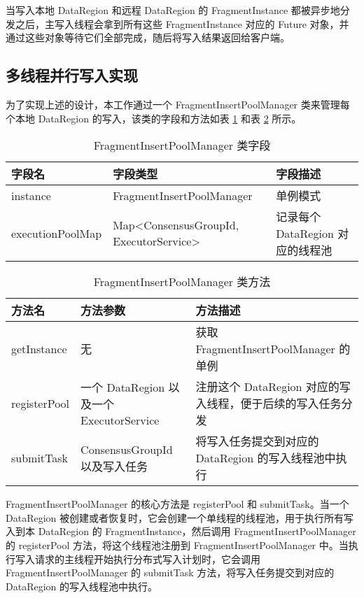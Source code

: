 当写入本地 DataRegion 和远程 DataRegion 的 FragmentInstance 都被异步地分发之后，主写入线程会拿到所有这些 FragmentInstance 对应的 Future 对象，并通过这些对象等待它们全部完成，随后将写入结果返回给客户端。

\subsection{多线程并行写入实现}
为了实现上述的设计，本工作通过一个 FragmentInsertPoolManager 类来管理每个本地 DataRegion 的写入，该类的字段和方法如表 \ref{tabular:fragment-insertion-pool-manager-fields} 和表 \ref{tabular:fragment-insertion-pool-manager-methods} 所示。

\begin{table}
  \centering
  \caption{FragmentInsertPoolManager 类字段}
  \label{tabular:fragment-insertion-pool-manager-fields}
  \begin{tabular}{lp{5cm}p{5cm}}
    \toprule
    字段名 & 字段类型 & 字段描述 \\
    \midrule
    instance & FragmentInsertPoolManager & 单例模式 \\
    executionPoolMap & Map<ConsensusGroupId, ExecutorService> & 记录每个 DataRegion 对应的线程池 \\
    \bottomrule
  \end{tabular}
\end{table}

\begin{table}
  \centering
  \caption{FragmentInsertPoolManager 类方法}
  \label{tabular:fragment-insertion-pool-manager-methods}
  \begin{tabular}{lp{5cm}p{5cm}}
    \toprule
    方法名 & 方法参数 & 方法描述 \\
    \midrule
    getInstance & 无 & 获取 FragmentInsertPoolManager 的单例 \\
    registerPool & 一个 DataRegion 以及一个 ExecutorService & 注册这个 DataRegion 对应的写入线程，便于后续的写入任务分发 \\
    submitTask & ConsensusGroupId 以及写入任务 & 将写入任务提交到对应的 DataRegion 的写入线程池中执行 \\
    \bottomrule
  \end{tabular}
\end{table}

FragmentInsertPoolManager 的核心方法是 registerPool 和 submitTask。当一个 DataRegion 被创建或者恢复时，它会创建一个单线程的线程池，用于执行所有写入到本 DataRegion 的 FragmentInstance，然后调用 FragmentInsertPoolManager 的 registerPool 方法，将这个线程池注册到 FragmentInsertPoolManager 中。当执行写入请求的主线程开始执行分布式写入计划时，它会调用 FragmentInsertPoolManager 的 submitTask 方法，将写入任务提交到对应的 DataRegion 的写入线程池中执行。

